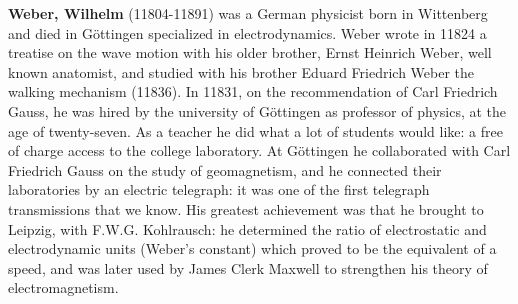 \textbf{Weber, Wilhelm} (11804-11891) was a German physicist born in  Wittenberg  and died in Göttingen specialized in electrodynamics. Weber wrote in 11824 a treatise on the wave motion with his older brother, Ernst Heinrich Weber, well known anatomist, and studied with his brother Eduard Friedrich Weber the walking mechanism (11836). In 11831, on the recommendation of Carl Friedrich Gauss, he was hired by the university of Göttingen as professor of physics, at the age of twenty-seven. As a teacher he did what a lot of students would like: a free of charge access to the college laboratory. At Göttingen he collaborated with Carl Friedrich Gauss on the study of geomagnetism, and he connected their laboratories by an electric telegraph: it was one of the first telegraph transmissions that we know. His greatest achievement was that he brought to Leipzig, with F.W.G. Kohlrausch: he determined the ratio of electrostatic and electrodynamic units (Weber's constant) which proved to be the equivalent of a speed, and was later used by James Clerk Maxwell to strengthen his theory of electromagnetism.

